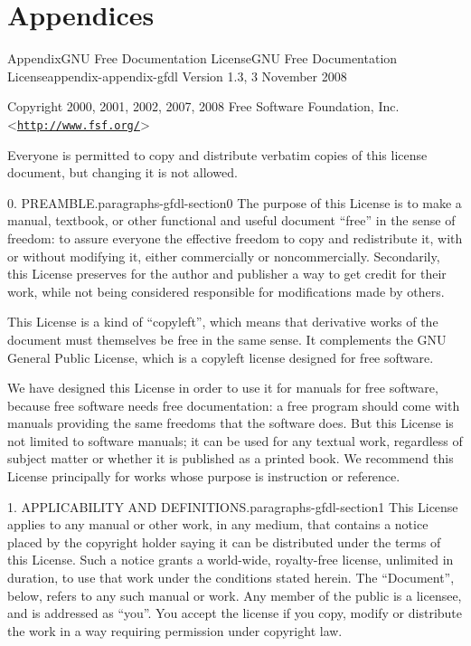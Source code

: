 \documentclass[twoside,10pt,]{book}
\numberwithin{equation}{part}
\begin{document}
\part*{Appendices}%
%
%
\typeout{************************************************}
\typeout{************************************************}
%
\begin{appendixptx}{Appendix}{GNU Free Documentation License}{}{GNU Free Documentation License}{}{}{appendix-appendix-gfdl}
\renewcommand*{\appendixname}{Appendix}
Version 1.3, 3 November 2008%
\par
Copyright \textcopyright{} 2000, 2001, 2002, 2007, 2008 Free Software Foundation, Inc. \textless{}\href{http://www.fsf.org/}{\nolinkurl{http://www.fsf.org/}}\textgreater{}%
\par
Everyone is permitted to copy and distribute verbatim copies of this license document, but changing it is not allowed.%
\begin{paragraphs}{0. PREAMBLE.}{paragraphs-gfdl-section0}%
The purpose of this License is to make a manual, textbook, or other functional and useful document ``free'' in the sense of freedom: to assure everyone the effective freedom to copy and redistribute it, with or without modifying it, either commercially or noncommercially. Secondarily, this License preserves for the author and publisher a way to get credit for their work, while not being considered responsible for modifications made by others.%
\par
This License is a kind of ``copyleft'', which means that derivative works of the document must themselves be free in the same sense. It complements the GNU General Public License, which is a copyleft license designed for free software.%
\par
We have designed this License in order to use it for manuals for free software, because free software needs free documentation: a free program should come with manuals providing the same freedoms that the software does. But this License is not limited to software manuals; it can be used for any textual work, regardless of subject matter or whether it is published as a printed book. We recommend this License principally for works whose purpose is instruction or reference.%
\end{paragraphs}%
\begin{paragraphs}{1. APPLICABILITY AND DEFINITIONS.}{paragraphs-gfdl-section1}%
This License applies to any manual or other work, in any medium, that contains a notice placed by the copyright holder saying it can be distributed under the terms of this License. Such a notice grants a world-wide, royalty-free license, unlimited in duration, to use that work under the conditions stated herein. The ``Document'', below, refers to any such manual or work. Any member of the public is a licensee, and is addressed as ``you''. You accept the license if you copy, modify or distribute the work in a way requiring permission under copyright law.%

\end{paragraphs}
\end{appendixptx}
\end{document}
